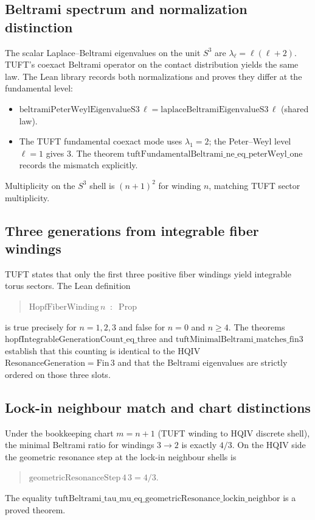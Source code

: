 \documentclass[11pt]{article}
\begin{document}
\subsection{Beltrami spectrum and normalization distinction}

The scalar Laplace--Beltrami eigenvalues on the unit $S^3$ are
$\lambda_\ell=\ell(\ell+2)$. TUFT's coexact Beltrami operator on the
contact distribution yields the same law. The Lean library records both
normalizations and proves they differ at the fundamental level:

\begin{itemize}
\item $\mathrm{beltramiPeterWeylEigenvalueS3}\,\ell =
  \mathrm{laplaceBeltramiEigenvalueS3}\,\ell$ (shared law).
\item The TUFT fundamental coexact mode uses $\lambda_1=2$; the Peter--Weyl
  level $\ell=1$ gives 3. The theorem
  $\mathrm{tuftFundamentalBeltrami\_ne\_eq\_peterWeyl\_one}$ records the
  mismatch explicitly.
\end{itemize}

Multiplicity on the $S^3$ shell is $(n+1)^2$ for winding $n$, matching
TUFT sector multiplicity.

\subsection{Three generations from integrable fiber windings}

TUFT states that only the first three positive fiber windings yield
integrable torus sectors. The Lean definition
\begin{quote}
$\mathrm{HopfFiberWinding}\,n \;\;:\;\; \mathrm{Prop}$
\end{quote}
is true precisely for $n=1,2,3$ and false for $n=0$ and $n\ge4$. The
theorems $\mathrm{hopfIntegrableGenerationCount\_eq\_three}$ and
$\mathrm{tuftMinimalBeltrami\_matches\_fin3}$ establish that this
counting is identical to the HQIV $\mathrm{ResonanceGeneration}=\mathrm{Fin}\,3$
and that the Beltrami eigenvalues are strictly ordered on those three
slots.

\subsection{Lock-in neighbour match and chart distinctions}

Under the bookkeeping chart $m=n+1$ (TUFT winding to HQIV discrete shell),
the minimal Beltrami ratio for windings $3\to2$ is exactly $4/3$. On the
HQIV side the geometric resonance step at the lock-in neighbour shells is
\begin{quote}
$\mathrm{geometricResonanceStep}\,4\,3 = 4/3$.
\end{quote}
The equality
$\mathrm{tuftBeltrami\_tau\_mu\_eq\_geometricResonance\_lockin\_neighbor}$
is a proved theorem.
\end{document}

